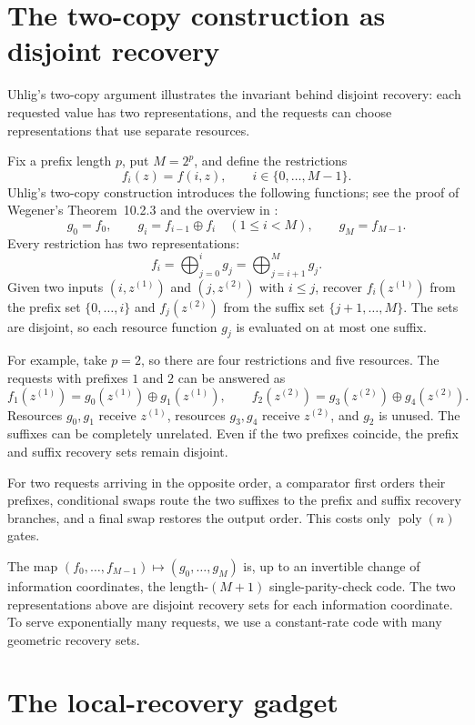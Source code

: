 \documentclass[11pt]{article}
\newcommand{\poly}{\operatorname{poly}}
\newcommand{\xor}{\mathbin{\oplus}}
\newcommand{\bigxor}{\bigoplus}
\begin{document}
\section{The two-copy construction as disjoint recovery}\label{sec:two-copy}

Uhlig's two-copy argument illustrates the invariant behind disjoint recovery:
each requested value has two representations, and the requests can choose
representations that use separate resources.

Fix a prefix length $p$, put $M=2^p$, and define the restrictions
\[
  f_i(z)=f(i,z),
  \qquad i\in\{0,\ldots,M-1\}.
\]
Uhlig's two-copy construction introduces the following functions; see the proof
of Wegener's Theorem~10.2.3 \cite{Wegener1987} and the overview in
\cite[Section~1.2]{Kretschmer2023}:
\[
  g_0=f_0,
  \qquad
  g_i=f_{i-1}\xor f_i\quad(1\le i<M),
  \qquad
  g_M=f_{M-1}.
\]
Every restriction has two representations:
\[
  f_i=\bigxor_{j=0}^{i}g_j
  =\bigxor_{j=i+1}^{M}g_j.
\]
Given two inputs $(i,z^{(1)})$ and $(j,z^{(2)})$ with $i\le j$, recover
$f_i(z^{(1)})$ from the prefix set
$\{0,\ldots,i\}$ and $f_j(z^{(2)})$ from the suffix set
$\{j+1,\ldots,M\}$.  The sets are disjoint, so each resource function $g_j$
is evaluated on at most one suffix.

For example, take $p=2$, so there are four restrictions and five resources.
The requests with prefixes $1$ and $2$ can be answered as
\[
  f_1(z^{(1)})=g_0(z^{(1)})\xor g_1(z^{(1)}),
  \qquad
  f_2(z^{(2)})=g_3(z^{(2)})\xor g_4(z^{(2)}).
\]
Resources $g_0,g_1$ receive $z^{(1)}$, resources $g_3,g_4$ receive $z^{(2)}$,
and $g_2$ is unused.  The suffixes can be completely unrelated.  Even if the
two prefixes coincide, the prefix and suffix recovery sets remain disjoint.

For two requests arriving in the opposite order, a comparator first orders
their prefixes, conditional swaps route the two suffixes to the prefix and
suffix recovery branches, and a final swap restores the output order.  This
costs only $\poly(n)$ gates.

The map $(f_0,\ldots,f_{M-1})\mapsto(g_0,\ldots,g_M)$ is, up to an invertible
change of information coordinates, the length-$(M+1)$ single-parity-check
code.  The two representations above are disjoint recovery sets for each
information coordinate.  To serve exponentially many requests, we use a
constant-rate code with many geometric recovery sets.

\section{The local-recovery gadget}\label{sec:code}
\end{document}
